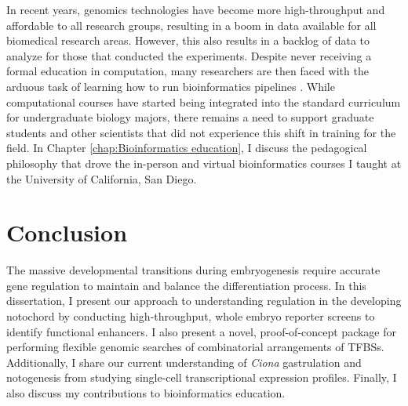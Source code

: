 \begin{dissertationintroduction}
    In recent years, genomics technologies have become more high-throughput and affordable to all research groups, resulting in a boom in data available for all biomedical research areas. However, this also results in a backlog of data to analyze for those that conducted the experiments. Despite never receiving a formal education in computation, many researchers are then faced with the arduous task of learning how to run bioinformatics pipelines \cite{barone2017, stephens2015}. While computational courses have started being integrated into the standard curriculum for undergraduate biology majors, there remains a need to support graduate students and other scientists that did not experience this shift in training for the field. In Chapter \ref{chap:Bioinformatics education}, I discuss the pedagogical philosophy that drove the in-person and virtual bioinformatics courses I taught at the University of California, San Diego. 

    \section{Conclusion}

    The massive developmental transitions during embryogenesis require accurate gene regulation to maintain and balance the differentiation process. In this dissertation, I present our approach to understanding regulation in the developing notochord by conducting high-throughput, whole embryo reporter screens to identify functional enhancers. I also present a novel, proof-of-concept package for performing flexible genomic searches of combinatorial arrangements of TFBSs. Additionally, I share our current understanding of \textit{Ciona} gastrulation and notogenesis from studying single-cell transcriptional expression profiles. Finally, I also discuss my contributions to bioinformatics education.
    
\end{dissertationintroduction}
